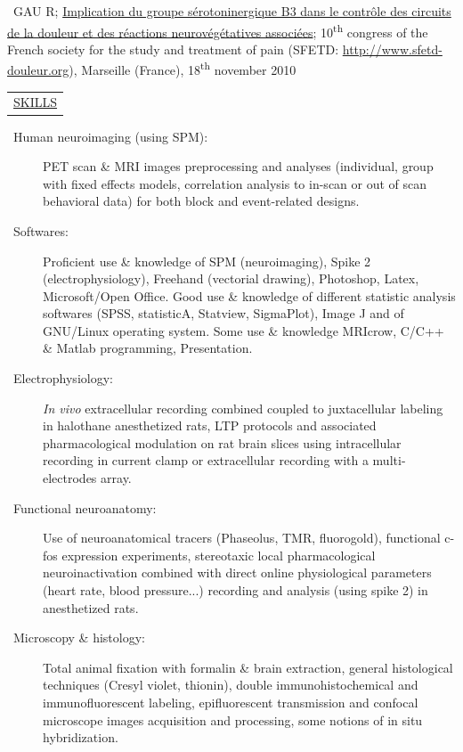 \documentclass[a4paper,12pt,oneside]{letter}
\begin{document}
\textbullet~GAU R; \href{http://www.sfetd-douleur.org/ModuleEventPublic/viewPresentation.phtml?about=rc\%2f2010\%2f10econgres\%2f10e-congre\%2fsession\%2f20101118-0845-20\%2f1015-62\%2f_container}{Implication du groupe sérotoninergique B3 dans le contrôle des circuits de la douleur et des réactions neurovégétatives associées}; 10\textsuperscript{th} congress of the French society for the study and treatment of pain (SFETD: \url{http://www.sfetd-douleur.org}), Marseille (France), 18\textsuperscript{th} november 2010

\begin{tabular}{B}
\underline{SKILLS}
\end{tabular}

\begin{description}
\item[\textbullet~Human neuroimaging (using SPM):] PET scan \& MRI images preprocessing and analyses (individual, group with fixed effects models, correlation analysis to in-scan or out of scan behavioral data) for both block and event-related designs.\\

\item [\textbullet~Softwares:] Proficient use \& knowledge of SPM (neuroimaging), Spike 2 (electrophysiology), Freehand (vectorial drawing), Photoshop, Latex, Microsoft/Open Office. Good use \& knowledge of different statistic analysis softwares (SPSS, statisticA, Statview, SigmaPlot), Image J and of GNU/Linux operating system. Some use \& knowledge MRIcrow, C/C++ \& Matlab programming, Presentation.

\item [\textbullet~Electrophysiology:] \textit{In vivo} extracellular recording combined coupled to juxtacellular labeling in halothane anesthetized rats, LTP protocols and associated pharmacological modulation on rat brain slices using intracellular recording in current clamp or extracellular recording with a multi-electrodes array. 

\item [\textbullet~Functional neuroanatomy:] Use of neuroanatomical tracers (Phaseolus, TMR, fluorogold), functional c-fos expression experiments, stereotaxic local pharmacological neuroinactivation combined with direct online physiological parameters (heart rate, blood pressure...) recording and analysis (using spike 2) in anesthetized rats. 

\item [\textbullet~Microscopy \& histology:] Total animal fixation with formalin \& brain extraction, general histological techniques (Cresyl violet, thionin), double immunohistochemical and immunofluorescent labeling, epifluorescent transmission and confocal microscope images acquisition and processing, some notions of in situ hybridization.

\end{description}
\end{document}
